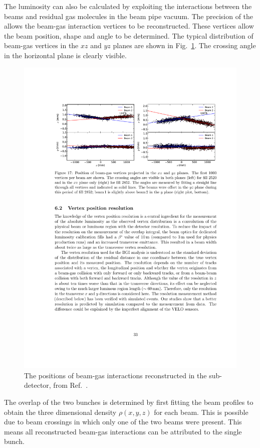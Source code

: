 The luminosity can also be calculated by exploiting the interactions between the beams and residual gas molecules in the beam pipe vacuum. The precision of the \velo allows the beam-gas interaction vertices to be reconstructed. These vertices allow the beam position, shape and angle to be determined. The typical distribution of beam-gas vertices in the $xz$ and $yz$ planes are shown in Fig.~\ref{fig:Dec_bgi_distro}. The crossing angle in the horizontal plane is clearly visible. 
\begin{figure}[!h]
    \centering
    \includegraphics[width=1.0\textwidth]{figs/Detector/lumi_bgi_distro.pdf}
    \caption{The positions of beam-gas interactions reconstructed in the \velo sub-detector, from Ref.~\cite{1748-0221-9-12-P12005}.}
    \label{fig:Dec_bgi_distro}   
\end{figure}
The overlap of the two bunches is determined by first fitting the beam profiles to obtain the three dimensional density $\rho(x,y,z)$ for each beam. This is possible due to beam crossings in which only one of the two beams were present. This means all reconstructed beam-gas interactions can be attributed to the single bunch. 


